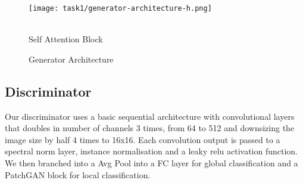 \documentclass[twoside,english,notitlepage]{report}
\begin{document}
\begin{figure}[h]
    \centering
    \texttt{[image: task1/generator-architecture-h.png]}
    \caption{Generator Architecture}
    \begin{fullwidth}[innermargin=-2cm,width=\linewidth+4cm,nobreak]
        \begin{minipage}[t]{.5\textwidth}
            \centering
            \\Self Attention Block
        \end{minipage}
        \begin{minipage}[t]{.5\textwidth}
            \centering
        \end{minipage}
    \end{fullwidth}
\end{figure}

\subsection{Discriminator}\label{task1:discriminator}
Our discriminator uses a basic sequential architecture with convolutional layers that doubles in number of channels 3 times, from 64 to 512 and downsizing the image size by half 4 times to 16x16. Each convolution output is passed to a spectral norm layer, instance normalisation and a leaky relu activation function. We then branched into a Avg Pool into a FC layer for global classification and a PatchGAN block for local classification. \\
\end{document}
